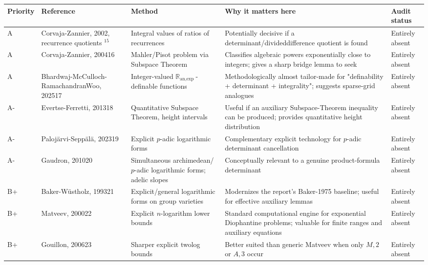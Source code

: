 \documentclass[10pt]{article}
\begin{document}
\begin{center}
\begin{tabular}[t]{|l|l|l|l|l|}
\hline
Priority & Reference & Method & Why it matters here & Audit status \\
\hline
A & Corvaja-Zannier, 2002, recurrence quotients ${ }^{15}$ & Integral values of ratios of recurrences & Potentially decisive if a determinant/divideddifference quotient is found & Entirely absent \\
\hline
A & Corvaja-Zannier, 200416 & Mahler/Pisot problem via Subspace Theorem & Classifies algebraic powers exponentially close to integers; gives a sharp bridge lemma to seek & Entirely absent \\
\hline
A & Bhardwaj-McCulloch-RamachandranWoo, 202517 & Integer-valued $\mathbb{R}_{\text {an,exp }}$-definable functions & Methodologically almost tailor-made for "definability + determinant + integrality"; suggests sparse-grid analogues & Entirely absent \\
\hline
A- & Evertse-Ferretti, 201318 & Quantitative Subspace Theorem, height intervals & Useful if an auxiliary Subspace-Theorem inequality can be produced; provides quantitative height distribution & Entirely absent \\
\hline
A- & Palojärvi-Seppälä, 202319 & Explicit $p$-adic logarithmic forms & Complementary explicit technology for $p$-adic determinant cancellation & Entirely absent \\
\hline
A- & Gaudron, 201020 & Simultaneous archimedean/ $p$-adic logarithmic forms; adelic slopes & Conceptually relevant to a genuine product-formula determinant & Entirely absent \\
\hline
B+ & Baker-Wüstholz, 199321 & Explicit/general logarithmic forms on group varieties & Modernizes the report's Baker-1975 baseline; useful for effective auxiliary lemmas & Entirely absent \\
\hline
B+ & Matveev, 200022 & Explicit $n$-logarithm lower bounds & Standard computational engine for exponential Diophantine problems; valuable for finite ranges and auxiliary equations & Entirely absent \\
\hline
B+ & Gouillon, 200623 & Sharper explicit twolog bounds & Better suited than generic Matveev when only $M, 2$ or $A, 3$ occur & Entirely absent \\
\hline
\end{tabular}
\end{center}
\end{document}
